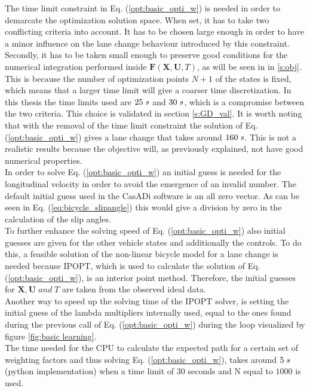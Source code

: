 The time limit constraint in Eq. (\ref{opt:basic_opti_w}) is needed in order to demarcate the optimization solution space. When set, it has to take two conflicting criteria into account. It has to be chosen large enough in order to have a minor influence on the lane change behaviour introduced by this constraint. Secondly, it has to be taken small enough to preserve good conditions for the numerical integration performed inside $\bm{F}(\bm{X},\bm{U}, T)$, as will be seen in in \ref{s:obj}. This is because the number of optimization points $N+1$ of the states is fixed, which means that a larger time limit will give a coarser time discretization. In this thesis the time limits used are $25\hspace{1mm}s$ and $30\hspace{1mm}s$, which is a compromise between the two criteria. This choice is validated in section \ref{s:GD_val}. It is worth noting that with the removal of the time limit constraint the solution of Eq. (\ref{opt:basic_opti_w}) gives a lane change that takes around $160 \hspace{1mm}s$. This is not a realistic results because the objective will, as previously explained, not have good numerical properties.\\ 

In order to solve Eq. (\ref{opt:basic_opti_w}) an initial guess is needed for the longitudinal velocity in order to avoid the emergence of an invalid number. The default initial guess used in the CasADi software is an all zero vector. As can be seen in Eq. (\ref{eq:bicycle_slipangle}) this would give a division by zero in the calculation of the slip angles. \\
To further enhance the solving speed of Eq. (\ref{opt:basic_opti_w}) also initial guesses are given for the other vehicle states and additionally the controls. To do this, a feasible solution of the non-linear bicycle model for a lane change is needed because IPOPT, which is used to calculate the solution of Eq. (\ref{opt:basic_opti_w}), is an interior point method. Therefore, the initial guesses for $\bm{X}, \bm{U} \;and\; T$ are taken from the observed ideal data.\\

Another way to speed up the solving time of the IPOPT solver, is setting the initial guess of the lambda multipliers internally used, equal to the ones found during the previous call of Eq. (\ref{opt:basic_opti_w}) during the loop visualized by figure \ref{fig:basic learning}. \\The time needed for the CPU to calculate the expected path for a certain set of weighting factors and thus solving Eq. (\ref{opt:basic_opti_w}), takes around $5\hspace{1mm}s$ (python implementation) when a time limit of $30$ seconds and N equal to $1000$ is used.\\

